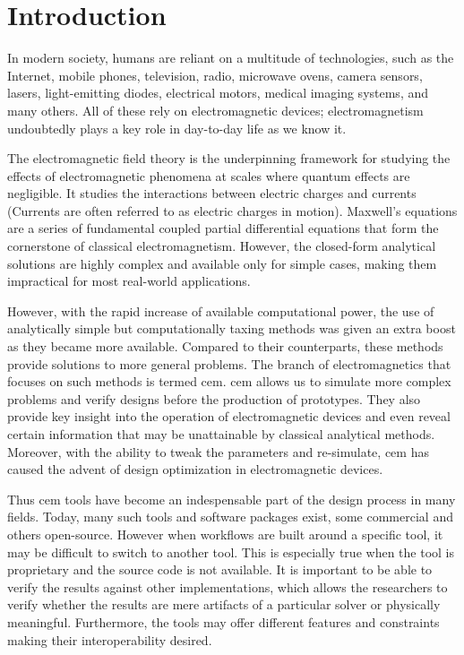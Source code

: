 \chapter{Introduction}
In modern society, humans are reliant on a multitude of technologies, such as the Internet, mobile phones, television, radio, microwave ovens, camera sensors, lasers, light-emitting diodes, electrical motors, medical imaging systems, and many others. All of these rely on electromagnetic devices; electromagnetism undoubtedly plays a key role in day-to-day life as we know it.


The electromagnetic field theory is the underpinning framework for studying the effects of electromagnetic phenomena at scales where quantum effects are negligible. It studies the interactions between electric charges and currents (Currents are often referred to as electric charges in motion). Maxwell's equations are a series of fundamental coupled partial differential equations that form the cornerstone of classical electromagnetism. However, the closed-form analytical solutions are highly complex and available only for simple cases, making them impractical for most real-world applications.


However, with the rapid increase of available computational power, the use of analytically simple but computationally taxing methods was given an extra boost as they became more available. Compared to their counterparts, these methods provide solutions to more general problems. The branch of electromagnetics that focuses on such methods is termed \gls{cem}. \gls{cem} allows us to simulate more complex problems and verify designs before the production of prototypes. They also provide key insight into the operation of electromagnetic devices and even reveal certain information that may be unattainable by classical analytical methods. Moreover, with the ability to tweak the parameters and re-simulate, \gls{cem} has caused the advent of design optimization in electromagnetic devices.

Thus \gls{cem} tools have become an indespensable part of the design process in many fields. Today, many such tools and software packages exist, some commercial and others open-source. However when workflows are built around a specific tool, it may be difficult to switch to another tool. This is especially true when the tool is proprietary and the source code is not available. It is important to be able to verify the results against other implementations, which allows the researchers to verify whether the results are mere artifacts of a particular solver or physically meaningful. Furthermore, the tools may offer different features and constraints making their interoperability desired. 

